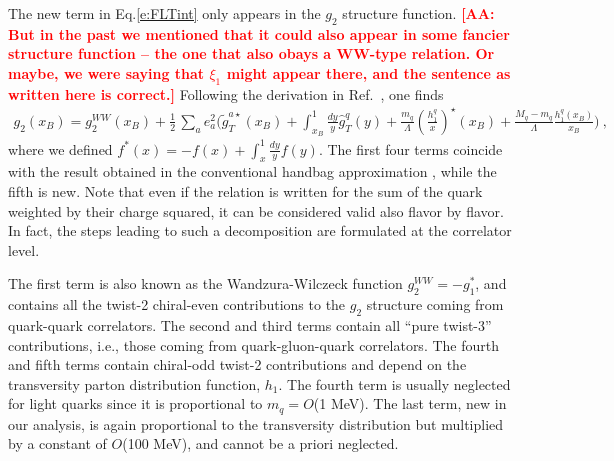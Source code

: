 \documentclass[preprintnumbers,floatfix,nofootinbib]{revtex4}
\def\AAcom#1{{\bf  \textcolor{Red}{[AA: {#1}]}}}
\newcommand{\xbj}{{x_B}}                   %
\newcommand{\mj}{M_q}
\newcommand{\mq}{m_q}
\begin{document}
The new term in Eq.\eqref{e:FLTint} only appears in the $g_2$ structure function. \AAcom{But in the past we mentioned that it could also appear in some fancier structure function -- the one that also obays a WW-type relation. Or maybe, we were saying that $\xi_1$ might appear there, and the sentence as written here is correct.} Following the derivation in Ref.~\cite{Accardi:2009au}, one finds
\begin{align}
\label{e:g2}
  g_2(\xbj) = g_2^{WW}(\xbj) + \frac{1}{2}\,\sum_a e_a^2
\biggl(
    \widetilde g_T^{a \star}(\xbj) 
    + \int_\xbj^1\frac{dy}{y} \widehat{g}_T^q(y) 
    + \frac{\mq}{\Lambda} \left(\frac{h_1^q}{x}\right)^\star(\xbj) 
    + \frac{\mj-\mq}{\Lambda} \frac{h_1^q(\xbj)}{\xbj} 
\Biggr) \ ,
\end{align}
where we defined $f^*(x) = -f(x) + \int_x^1\frac{dy}{y} f(y)$. The first four
terms coincide with the result obtained in the conventional handbag
approximation \cite{Accardi:2009au}, while the fifth is new. Note that even if
the relation is written for the sum of the quark weighted by their charge
squared, it can be considered valid also flavor by flavor. In fact, the steps
leading to such a decomposition are formulated at the correlator level.

The first term is also known as the Wandzura-Wilczeck function $g_2^{WW} =
-g_1^*$, and contains all the twist-2 chiral-even contributions to
the $g_2$ structure coming from quark-quark correlators. The second and third
terms contain all ``pure twist-3'' contributions, i.e., those coming from
quark-gluon-quark correlators. The fourth and fifth terms contain chiral-odd twist-2 contributions and depend on the
transversity parton distribution function, $h_1$. 
The fourth term is usually neglected for
light quarks since it is proportional to $\mq=O$(1 MeV). The last term,
new in our analysis, is again proportional to the transversity distribution but multiplied by a constant of $O$(100 MeV), and cannot be a priori neglected.
\end{document}
